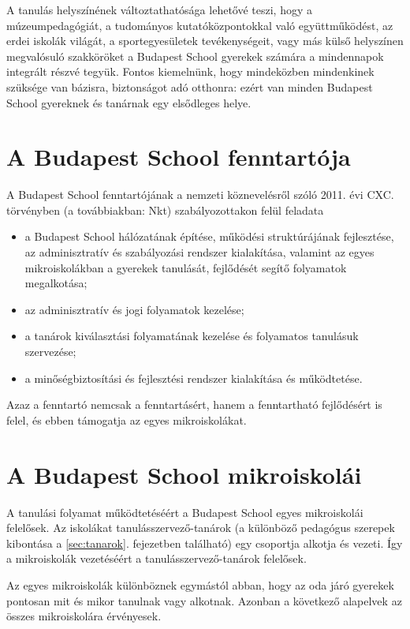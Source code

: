 A tanulás helyszínének változtathatósága lehetővé teszi, hogy a múzeumpedagógiát, a tudományos kutatóközpontokkal való együttműködést, az erdei iskolák világát, a sportegyesületek tevékenységeit, vagy más külső helyszínen megvalósuló szakköröket a Budapest School gyerekek számára a mindennapok integrált részvé tegyük. Fontos kiemelnünk, hogy mindeközben mindenkinek szüksége van bázisra, biztonságot adó otthonra: ezért van minden Budapest School gyereknek és tanárnak egy elsődleges helye.
\ifkerettanterv
  \section{A Budapest School fenntartója}
  A Budapest School fenntartójának a nemzeti köznevelésről szóló 2011. évi CXC. törvényben (a továbbiakban: Nkt)  szabályozottakon felül feladata
  \begin{itemize}
  \item a Budapest School hálózatának építése, működési struktúrájának
  fejlesztése, az adminisztratív és szabályozási rendszer kialakítása,
  valamint az egyes mikroiskolákban a gyerekek tanulását, fejlődését segítő folyamatok megalkotása;
  \item  az adminisztratív és jogi folyamatok kezelése;
  \item  a tanárok kiválasztási folyamatának kezelése és folyamatos tanulásuk szervezése;
  \item a minőségbiztosítási és fejlesztési rendszer kialakítása és működtetése.
\end{itemize}

 Azaz a fenntartó nemcsak a fenntartásért, hanem a fenntartható fejlődésért is felel, és ebben támogatja az egyes mikroiskolákat.

  \section{A Budapest School mikroiskolái}
\fi
  A tanulási folyamat működtetéséért a Budapest School egyes mikroiskolái
  felelősek. Az iskolákat tanulásszervező-tanárok (a különböző pedagógus szerepek kibontása a \ref{sec:tanarok}. fejezetben található) egy csoportja alkotja és vezeti. Így a
  mikroiskolák vezetéséért a tanulásszervező-tanárok felelősek.

  Az egyes mikroiskolák különböznek egymástól abban, hogy az oda járó gyerekek pontosan mit és mikor
  tanulnak vagy alkotnak. Azonban a következő alapelvek az összes mikroiskolára
  érvényesek.

